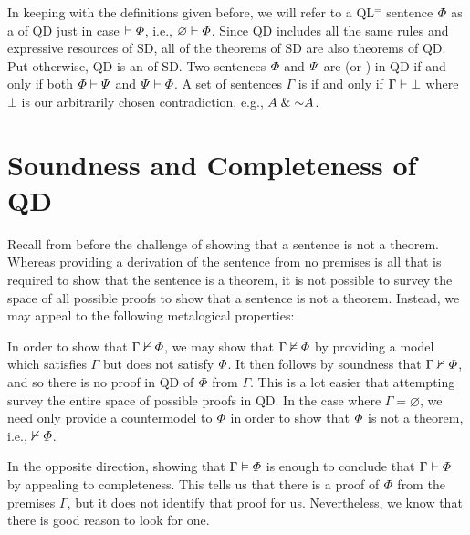 In keeping with the definitions given before, we will refer to a QL$^=$ sentence $\varPhi$ as a  of QD just in case $\vdash\varPhi$, i.e., $\varnothing\vdash\varPhi$.
Since QD includes all the same rules and expressive resources of SD, all of the theorems of SD are also theorems of QD.
Put otherwise, QD is an  of SD.
Two sentences $\varPhi$ and $\varPsi$ are  (or ) in QD if and only if both $\varPhi\vdash\varPsi$ and $\varPsi\vdash\varPhi$.
A set of sentences $\Gamma$ is  if and only if $\Gamma\vdash\bot$ where $\bot$ is our arbitrarily chosen contradiction, e.g., $A\eand\enot A$.




\section{Soundness and Completeness of QD}

Recall from before the challenge of showing that a sentence is not a theorem.
Whereas providing a derivation of the sentence from no premises is all that is required to show that the sentence is a theorem, it is not possible to survey the space of all possible proofs to show that a sentence is not a theorem.
Instead, we may appeal to the following metalogical properties:

\vspace{-.4in}

In order to show that $\Gamma \nvdash \varPhi$, we may show that $\Gamma \nvDash \varPhi$ by providing a model which satisfies $\Gamma$ but does not satisfy $\varPhi$.
It then follows by soundness that $\Gamma \nvdash \varPhi$, and so there is no proof in QD of $\varPhi$ from $\Gamma$.
This is a lot easier that attempting survey the entire space of possible proofs in QD.
In the case where $\Gamma=\varnothing$, we need only provide a countermodel to $\varPhi$ in order to show that $\varPhi$ is not a theorem, i.e., $\nvdash \varPhi$.

In the opposite direction, showing that $\Gamma \vDash \varPhi$ is enough to conclude that $\Gamma \vdash \varPhi$ by appealing to completeness.
This tells us that there is a proof of $\varPhi$ from the premises $\Gamma$, but it does not identify that proof for us.
Nevertheless, we know that there is good reason to look for one.

